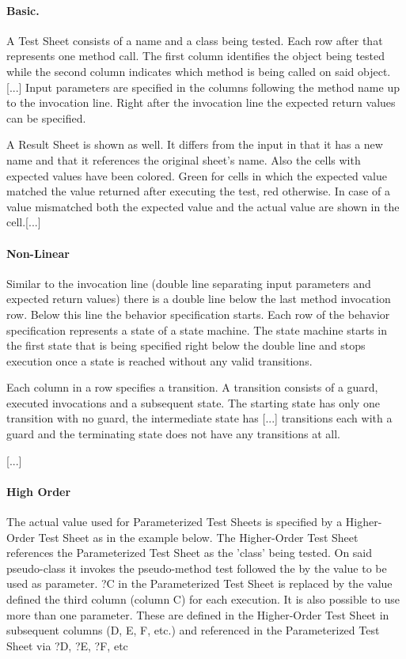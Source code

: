 \documentclass{llncs}
\begin{document}
 \paragraph{Basic.}
A Test Sheet consists of a name and a class being tested. 
Each row after that represents one method call.
The first column identifies the object being tested while the second column indicates which method is being called on said object. [...]
Input parameters are specified in the columns following the method name up to the invocation line. 
Right after the invocation line the expected return values can be specified.

A Result Sheet is shown as well. 
It differs from the input in that it has a new name and that it references the original sheet's name. 
Also the cells with expected values have been colored. 
Green for cells in which the expected value matched the value returned after executing the test, red otherwise. 
In case of a value mismatched both the expected value and the actual value are shown in the cell.[...]\cite{tsb}

 \paragraph{Non-Linear}
Similar to the invocation line (double line separating input parameters and expected return values) there is a double line below the last method invocation row.
Below this line the behavior specification starts. 
Each row of the behavior specification represents a state of a state machine. 
The state machine starts in the first state that is being specified right below the double line and stops execution once a state is reached without any valid transitions.

Each column in a row specifies a transition. 
A transition consists of a guard, executed invocations and a subsequent state. 
The starting state has only one transition with no guard, the intermediate state has [...] transitions each with a guard and the terminating state does not have any transitions at all.

[...]\cite{tsn}

\paragraph{High Order}
The actual value used for Parameterized Test Sheets is specified by a Higher-Order Test Sheet as in the example below. 
The Higher-Order Test Sheet references the Parameterized Test Sheet as the 'class' being tested. 
On said pseudo-class it invokes the pseudo-method test followed the by the value to be used as parameter. 
?C in the Parameterized Test Sheet is replaced by the value defined the third column (column C) for each execution.
It is also possible to use more than one parameter. These are defined in the Higher-Order Test Sheet in subsequent columns (D, E, F, etc.) and referenced in the Parameterized Test Sheet via ?D, ?E, ?F, etc
\end{document}
